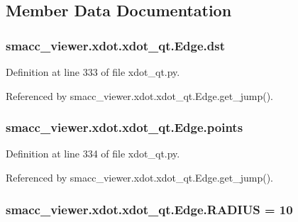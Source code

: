 \subsection{Member Data Documentation}
\subsubsection[{\texorpdfstring{dst}{dst}}]{\setlength{\rightskip}{0pt plus 5cm}smacc\+\_\+viewer.\+xdot.\+xdot\+\_\+qt.\+Edge.\+dst}\hypertarget{classsmacc__viewer_1_1xdot_1_1xdot__qt_1_1Edge_ac3d671e3f4486291b249df4608b775b5}{}\label{classsmacc__viewer_1_1xdot_1_1xdot__qt_1_1Edge_ac3d671e3f4486291b249df4608b775b5}


Definition at line 333 of file xdot\+\_\+qt.\+py.



Referenced by smacc\+\_\+viewer.\+xdot.\+xdot\+\_\+qt.\+Edge.\+get\+\_\+jump().

\subsubsection[{\texorpdfstring{points}{points}}]{\setlength{\rightskip}{0pt plus 5cm}smacc\+\_\+viewer.\+xdot.\+xdot\+\_\+qt.\+Edge.\+points}\hypertarget{classsmacc__viewer_1_1xdot_1_1xdot__qt_1_1Edge_ac0a98c09c470ac737011283bb9e6108e}{}\label{classsmacc__viewer_1_1xdot_1_1xdot__qt_1_1Edge_ac0a98c09c470ac737011283bb9e6108e}


Definition at line 334 of file xdot\+\_\+qt.\+py.



Referenced by smacc\+\_\+viewer.\+xdot.\+xdot\+\_\+qt.\+Edge.\+get\+\_\+jump().

\subsubsection[{\texorpdfstring{R\+A\+D\+I\+US}{RADIUS}}]{ smacc\+\_\+viewer.\+xdot.\+xdot\+\_\+qt.\+Edge.\+R\+A\+D\+I\+US = 10\hspace{0.3cm}{\ttfamily [static]}}\hypertarget{classsmacc__viewer_1_1xdot_1_1xdot__qt_1_1Edge_ad7c0b0732d1f024cf4bd1e379dd8d470}{}\label{classsmacc__viewer_1_1xdot_1_1xdot__qt_1_1Edge_ad7c0b0732d1f024cf4bd1e379dd8d470}


